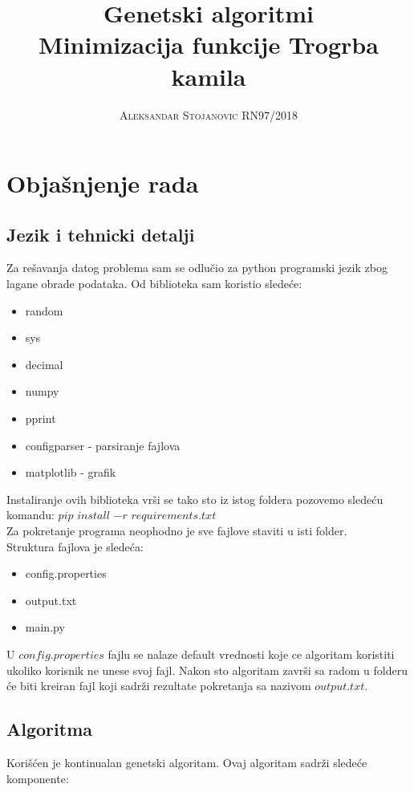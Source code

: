\documentclass[a4paper,11pt]{book}
\title{\Huge \textbf{Genetski algoritmi} \\ \huge Minimizacija funkcije Trogrba kamila \\ }
\author{\textsc{Aleksandar Stojanovic RN97/2018}}
\begin{document}
\frontmatter
\maketitle

\mainmatter

\chapter{Objašnjenje rada}

\section{Jezik i tehnicki detalji}
Za rešavanja datog problema sam se odlučio za python programski jezik zbog lagane obrade podataka. Od biblioteka sam koristio sledeće:

\begin{itemize}
  \item random
  \item sys
  \item decimal
  \item numpy
  \item pprint
  \item configparser - parsiranje fajlova
  \item matplotlib - grafik
\end{itemize}

Instaliranje ovih biblioteka vrši se tako sto iz istog foldera pozovemo sledeću komandu: $pip$ $install$ $-r$ $requirements.txt$ \\
Za pokretanje programa neophodno je sve fajlove staviti u isti folder.\\

Struktura fajlova je sledeća:
\begin{itemize}
  \item config.properties
  \item output.txt
  \item main.py
\end{itemize}

U $config.properties$ fajlu se nalaze default vrednosti koje ce algoritam koristiti ukoliko korisnik ne unese svoj fajl. Nakon sto algoritam završi sa radom u folderu će biti kreiran fajl koji sadrži rezultate pokretanja sa nazivom $output.txt$.

\section{Algoritma}
Korišćen je kontinualan genetski algoritam. Ovaj algoritam sadrži sledeće komponente:
\end{document}

